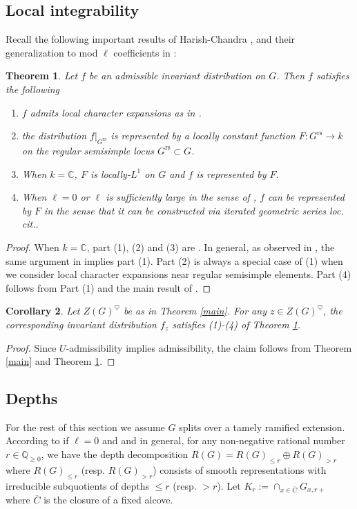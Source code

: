 \documentclass[12pt]{amsart}
\newtheorem{thm}{Theorem}[section]
\newtheorem{corollary}[thm]{Corollary}
\theoremstyle{definition}
\numberwithin{equation}{section}
\theoremstyle{remark}
\newcommand{\Grs}{G^{\mathrm{rs}}}
\begin{document}
\subsection{Local integrability }
Recall the following important results of Harish-Chandra \cite{HC99}, and their generalization to mod $\ell$ coefficients in \cite{T26}:

\begin{thm}\label{HC99}
Let $f$ be an admissible invariant distribution on $G$. Then $f$ satisfies the following
\begin{enumerate}
    \item $f$ admits local character expansions as in \cite[Theorem 16.2]{HC99}.
    \item the distribution $f|_{\Grs}$
    is represented by a locally constant function 
    $F:\Grs\to k$ on the regular semisimple locus $\Grs\subset G$.
    \item When $k=\mathbb{C}$, $F$ is locally-$L^1$ on $G$ 
    and $f$ is represented by $F$. 
    \item
    When $\ell=0$ or $\ell$ is sufficiently large in the sense of \cite[Remark 3.2]{T26}, $f$ can be represented by $F$ in the sense that it can be constructed via iterated geometric series {\it loc. cit.}.
\end{enumerate}
\end{thm}
\begin{proof}
    When $k=\mathbb C$, part (1), (2) and (3) 
    are  \cite[Theorem 16.1, 16.2, 16.3]{HC99}.
    In general, as observed in \cite[Th\'{e}ore\`{m}e 5.4.4]{VW01},  the same argument in \cite{HC99} implies part (1). Part (2) is always a special case of (1) when we consider local character expansions near regular semisimple elements. Part (4) follows from Part (1) and the main result of \cite{T26}.
\end{proof}

\begin{corollary}\label{local int for z} Let $Z(G)^{\heartsuit}$ be as in Theorem \ref{main}. For any
$z\in Z(G)^\heartsuit$, the corresponding 
invariant distribution $f_z$ satisfies 
(1)-(4) of Theorem \ref{HC99}.
\end{corollary}
\begin{proof}
    Since $U$-admissibility implies admissibility, the claim follows from Theorem \ref{main} and Theorem \ref{HC99}.
\end{proof}

\subsection{Depths} For the rest of this section we assume $G$ splits over a tamely ramified extension. According to \cite{MP94,MP96,BD84} if $\ell=0$ and  \cite{V96} and \cite[Appendice A]{D09} in general, %
for any non-negative rational number $r\in\mathbb Q_{\geq0}$, we have the depth decomposition $R(G)=R(G)_{\leq r}\oplus R(G)_{>r}$
where $R(G)_{\leq r}$
(resp. $R(G)_{>r}$)
consists of smooth representations with
irreducible subquotients of depths $\leq r$ (resp. $>r$). Let 
$K_r:=\cap_{x\in\overline{C}}G_{x,r+}$ where $\overline{C}$ is the closure of a fixed alcove.
\end{document}
